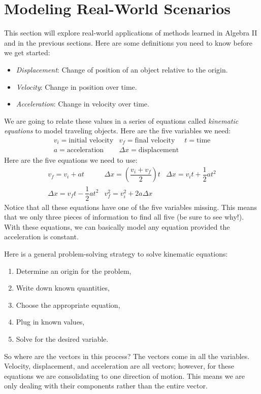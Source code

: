\documentclass[../book.tex]{subfiles}
\begin{document}
\section{Modeling Real-World Scenarios}
\noindent This section will explore real-world applications of methods learned in Algebra II and in the previous sections.  Here are some definitions you need to know before we get started: \begin{itemize}
    \item \textit{Displacement}: Change of position of an object relative to the origin.
    \item \textit{Velocity}: Change in position over time.
    \item \textit{Acceleration}: Change in velocity over time.
\end{itemize}
We are going to relate these values in a series of equations called \textit{kinematic equations} to model traveling objects. Here are the five variables we need: $$\begin{matrix} v_i=\text{initial velocity} & v_f=\text{final velocity} & t=\text{time} \\ a=\text{acceleration} & \Delta x=\text{displacement} \end{matrix}$$ Here are the five equations we need to use: $$\begin{matrix} v_f=v_i+at & \Delta x=\left(\dfrac{v_i+v_f}{2}\right)t & \Delta x=v_it+\dfrac{1}{2}at^2 \\ \Delta x=v_ft-\dfrac{1}{2}at^2 & v_f^2=v_i^2+2a\Delta x\end{matrix}$$
Notice that all these equations have one of the five variables missing.  This means that we only three pieces of information to find all five (be sure to see why!).  With these equations, we can basically model any equation provided the acceleration is constant.

Here is a general problem-solving strategy to solve kinematic equations: \begin{enumerate}
    \item Determine an origin for the problem,
    \item Write down known quantities,
    \item Choose the appropriate equation,
    \item Plug in known values,
    \item Solve for the desired variable.
\end{enumerate}
So where are the vectors in this process? The vectors come in all the variables.  Velocity, displacement, and acceleration are all vectors; however, for these equations we are consolidating to one direction of motion.  This means we are only dealing with their components rather than the entire vector.
\end{document}
